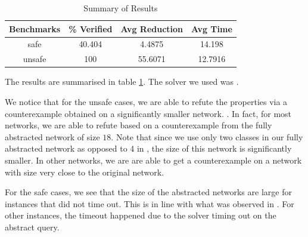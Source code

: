 \begin{table}
\begin{tabular}{ |c|c|c|c| }
\hline
Benchmarks &    \% Verified &  Avg Reduction &  Avg Time \\
\hline
safe       &        40.404  &         4.4875 &   14.198  \\
unsafe     &       100      &        55.6071 &   12.7916 \\
\hline
\end{tabular}
\caption{Summary of \acasxu Results}
\label{t:acas-summary}
\end{table}

The results are summarised in table \ref{t:acas-summary}. The solver we used was
\abcrown.  

We notice that for the unsafe cases, we are able to refute the
properties via a counterexample obtained on a significantly smaller network.
. In fact, for most
networks, we are able to refute based on a counterexample from the fully
abstracted network of size $18$.  Note that since we use only two classes in our
fully abstracted network as opposed to 4 in \cite{cegar-nn}, the size of this
network is significantly smaller. In other networks, we are are able to get a
counterexample on a network with size very close to the original network.

For the safe cases, we see that the size of the abstracted networks are large
for instances that did not time out.  This is in line with what was observed in
\cite{cegar-nn} . For other instances, the timeout happened
due to the solver timing out on the abstract query. 

